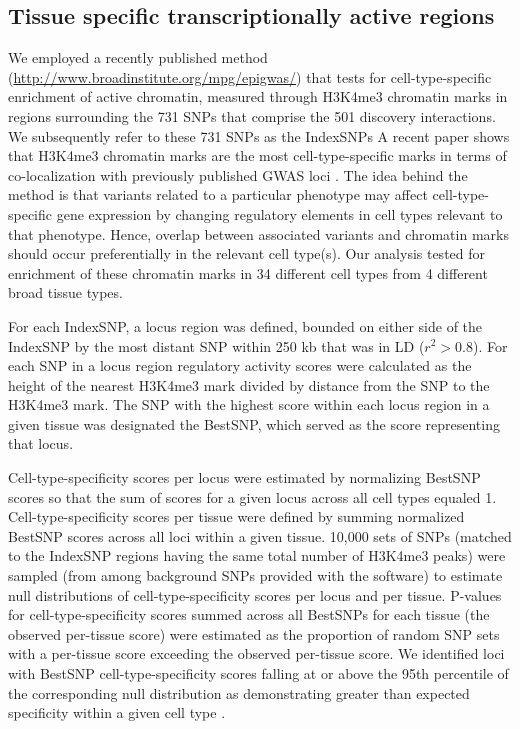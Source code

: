 \documentclass{article}
\begin{document}
\subsection{Tissue specific transcriptionally active regions}

We employed a recently published method (\url{http://www.broadinstitute.org/mpg/epigwas/}) \cite{Trynka2013} that tests for cell-type-specific enrichment of active chromatin, measured through H3K4me3 chromatin marks \cite{Koch2007} in regions surrounding the 731 SNPs that comprise the 501 discovery interactions. We subsequently refer to these 731 SNPs as the IndexSNPs A recent paper shows that H3K4me3 chromatin marks are the most cell-type-specific marks in terms of co-localization with previously published GWAS loci \cite{Trynka2013}. The idea behind the method is that variants related to a particular phenotype may affect cell-type-specific gene expression by changing regulatory elements in cell types relevant to that phenotype. Hence, overlap between associated variants and chromatin marks should occur preferentially in the relevant cell type(s). Our analysis tested for enrichment of these chromatin marks in 34 different cell types from 4 different broad tissue types.

For each IndexSNP, a locus region was defined, bounded on either side of the IndexSNP by the most distant SNP within 250 kb that was in LD ($r^{2} > 0.8$). For each SNP in a locus region regulatory activity scores were calculated as the height of the nearest H3K4me3 mark divided by distance from the SNP to the H3K4me3 mark. The SNP with the highest score within each locus region in a given tissue was designated the BestSNP, which served as the score representing that locus.

Cell-type-specificity scores per locus were estimated by normalizing BestSNP scores so that the sum of scores for a given locus across all cell types equaled 1. Cell-type-specificity scores per tissue were defined by summing normalized BestSNP scores across all loci within a given tissue. 10,000 sets of SNPs (matched to the IndexSNP regions having the same total number of H3K4me3 peaks) were sampled (from among background SNPs provided with the software) to estimate null distributions of cell-type-specificity scores per locus and per tissue. P-values for cell-type-specificity scores summed across all BestSNPs for each tissue (the observed per-tissue score) were estimated as the proportion of random SNP sets with a per-tissue score exceeding the observed per-tissue score. We identified loci with BestSNP cell-type-specificity scores falling at or above the 95th percentile of the corresponding null distribution as demonstrating greater than expected specificity within a given cell type \cite{Trynka2013}.
\end{document}
